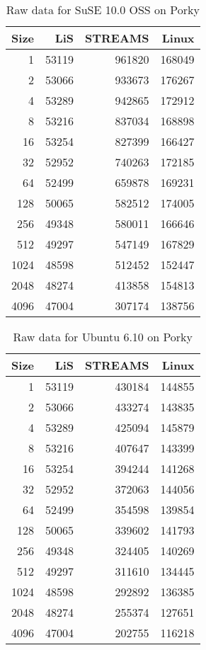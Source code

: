 \documentclass[letterpaper,final,notitlepage,twocolumn,10pt,twoside]{article}
\let\normalsize = \small
\let\small = \footnotesize
\let\footnotesize = \scriptsize
\let\scriptsize = \tiny
\begin{document}
\begin{appendix}
\begin{table}[h]
\footnotesize
\setlength{\tabcolsep}{0.3em}
\setlength{\arraycolsep}{0.3em}
\begin{center}
\begin{tabular}{rrrr}\\
\hline
Size & LiS & STREAMS & Linux\\
\hline
\hline
1 & 53119 & 961820 & 168049\\
2 & 53066 & 933673 & 176267\\
4 & 53289 & 942865 & 172912\\
8 & 53216 & 837034 & 168898\\
16 & 53254 & 827399 & 166427\\
32 & 52952 & 740263 & 172185\\
64 & 52499 & 659878 & 169231\\
128 & 50065 & 582512 & 174005\\
256 & 49348 & 580011 & 166646\\
512 & 49297 & 547149 & 167829\\
1024 & 48598 & 512452 & 152447\\
2048 & 48274 & 413858 & 154813\\
4096 & 47004 & 307174 & 138756\\
\hline
\end{tabular}
\end{center}
\caption{Raw data for SuSE 10.0 OSS on Porky}
\label{table:susedata}
\normalsize
\end{table}

\begin{table}[hp]
\footnotesize
\setlength{\tabcolsep}{0.3em}
\setlength{\arraycolsep}{0.3em}
\begin{center}
\begin{tabular}{rrrr}\\
\hline
Size & LiS & STREAMS & Linux\\
\hline
\hline
1 & 53119 & 430184 & 144855\\
2 & 53066 & 433274 & 143835\\
4 & 53289 & 425094 & 145879\\
8 & 53216 & 407647 & 143399\\
16 & 53254 & 394244 & 141268\\
32 & 52952 & 372063 & 144056\\
64 & 52499 & 354598 & 139854\\
128 & 50065 & 339602 & 141793\\
256 & 49348 & 324405 & 140269\\
512 & 49297 & 311610 & 134445\\
1024 & 48598 & 292892 & 136385\\
2048 & 48274 & 255374 & 127651\\
4096 & 47004 & 202755 & 116218\\
\hline
\end{tabular}
\end{center}
\caption{Raw data for Ubuntu 6.10 on Porky}
\label{table:ubuntudata}
\normalsize
\end{table}


\end{appendix}
\end{document}

